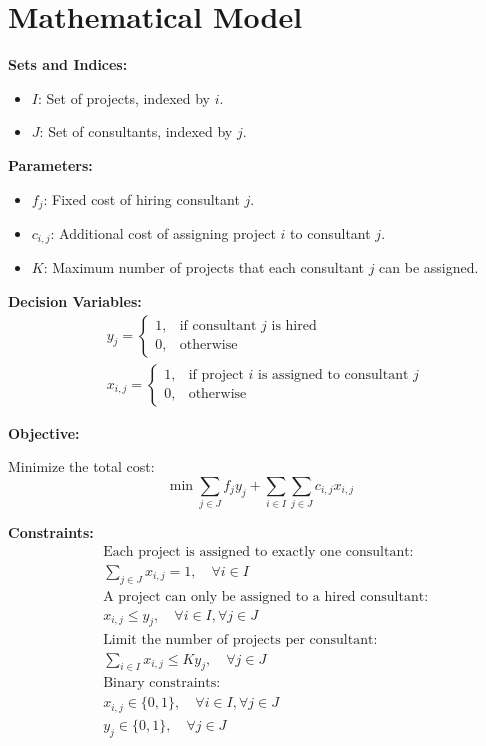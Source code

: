 \documentclass{article}
\begin{document}
\section*{Mathematical Model}

\textbf{Sets and Indices:}
\begin{itemize}
    \item \(I\): Set of projects, indexed by \(i\).
    \item \(J\): Set of consultants, indexed by \(j\).
\end{itemize}

\textbf{Parameters:}
\begin{itemize}
    \item \(f_j\): Fixed cost of hiring consultant \(j\).
    \item \(c_{i,j}\): Additional cost of assigning project \(i\) to consultant \(j\).
    \item \(K\): Maximum number of projects that each consultant \(j\) can be assigned.
\end{itemize}

\textbf{Decision Variables:}
\begin{align*}
    & y_j = 
    \begin{cases} 
    1, & \text{if consultant } j \text{ is hired} \\
    0, & \text{otherwise}
    \end{cases} \\
    & x_{i,j} = 
    \begin{cases} 
    1, & \text{if project } i \text{ is assigned to consultant } j \\
    0, & \text{otherwise}
    \end{cases} 
\end{align*}

\textbf{Objective:}

Minimize the total cost:
\[
\min \sum_{j \in J} f_j y_j + \sum_{i \in I} \sum_{j \in J} c_{i,j} x_{i,j}
\]

\textbf{Constraints:}
\begin{align*}
    & \text{Each project is assigned to exactly one consultant:} \\
    & \sum_{j \in J} x_{i,j} = 1, \quad \forall i \in I \\
    & \text{A project can only be assigned to a hired consultant:} \\
    & x_{i,j} \leq y_j, \quad \forall i \in I, \forall j \in J \\
    & \text{Limit the number of projects per consultant:} \\
    & \sum_{i \in I} x_{i,j} \leq K y_j, \quad \forall j \in J \\
    & \text{Binary constraints:} \\
    & x_{i,j} \in \{0, 1\}, \quad \forall i \in I, \forall j \in J \\
    & y_j \in \{0, 1\}, \quad \forall j \in J
\end{align*}
\end{document}
